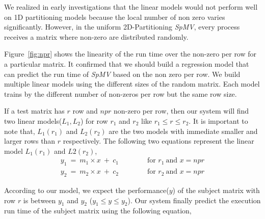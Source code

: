 \documentclass[conference, 10ppt]{IEEEtran}
\begin{document}
We realized in early investigations that the linear models would not
perform well on 1D partitioning models because the local number of non
zero varies significantly. However, in the uniform 2D-Partitioning
\textit{SpMV}, every process receives a matrix where non-zero are
distributed randomly.

Figure~\ref{fig:npr} shows the linearity of the run time over the
non-zero per row for a particular matrix. It confirmed that we should
build a regression model that can predict the run time of
\textit{SpMV} based on the non zero per row. We build multiple linear
models using the different sizes of the random matrix. Each model
trains by the different number of non-zeros per row but the same row
size.

If a test matrix has $r$ row and $npr$ non-zero per row, then our
system will find two linear models($L_1, L_2$) for row $r_1$ and $r_2$
like $r_1\leq r\leq r_2$.  It is important to note that, $L_1(r_1)$
and $L_2(r_2)$ are the two models with immediate smaller and larger rows
than $r$ respectively.  The following two equations represent the
linear model $L_1(r_1)$ and $L2(r_2)$,
\begin{equation*}
\begin{array}{l}
y_1\ =\ m_1\times x\ +\ c_1  \qquad\qquad\text{for } r_1 \ \text{and } x=npr\\
y_2\ =\ m_2\times x\ +\ c_2  \qquad\qquad\text{for } r_2 \ \text{and } x=npr
\end{array}
\end{equation*}

According to our model, we expect the performance($y$) of the subject
matrix with row $r$ is between $y_1$ and $y_2$ ($y_1\leq y\leq
y_2$). Our system finally predict the execution run time of the
subject matrix using the following equation,
\end{document}
